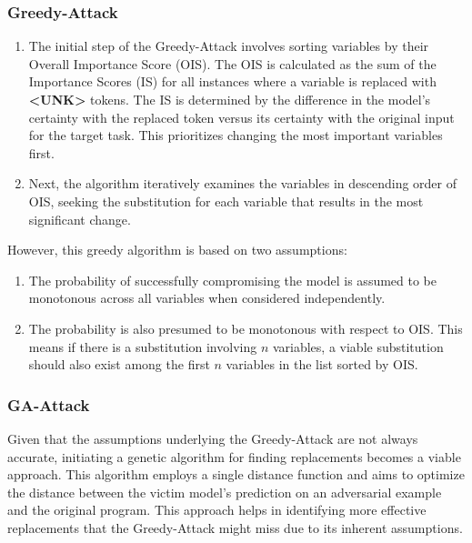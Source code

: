 \documentclass[12pt,letterpaper]{article}
\begin{document}
\subsubsection*{Greedy-Attack}
\begin{enumerate}
  \item The initial step of the Greedy-Attack involves sorting variables by their Overall Importance Score (OIS). The OIS is calculated as the sum of the Importance Scores (IS) for all instances where a variable is replaced with \textbf{\textless UNK\textgreater} tokens. The IS is determined by the difference in the model's certainty with the replaced token versus its certainty with the original input for the target task. This prioritizes changing the most important variables first.
  \item Next, the algorithm iteratively examines the variables in descending order of OIS, seeking the substitution for each variable that results in the most significant change.
\end{enumerate}
However, this greedy algorithm is based on two assumptions:
\begin{enumerate}
  \item The probability of successfully compromising the model is assumed to be monotonous across all variables when considered independently.
  \item The probability is also presumed to be monotonous with respect to OIS. This means if there is a substitution involving $n$ variables, a viable substitution should also exist among the first $n$ variables in the list sorted by OIS.
\end{enumerate}

\subsubsection*{GA-Attack}
Given that the assumptions underlying the Greedy-Attack are not always accurate, initiating a genetic algorithm for finding replacements becomes a viable approach. This algorithm employs a single distance function and aims to optimize the distance between the victim model's prediction on an adversarial example and the original program. This approach helps in identifying more effective replacements that the Greedy-Attack might miss due to its inherent assumptions.
\end{document}
